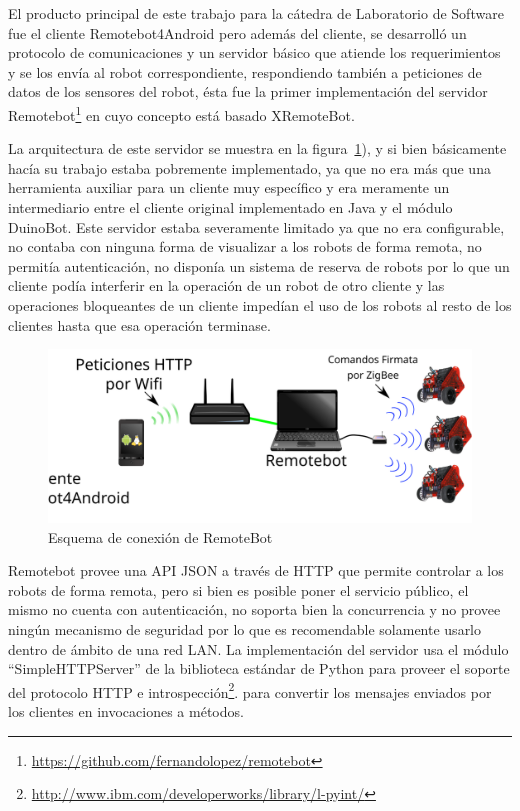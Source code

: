 El producto principal de este trabajo para la cátedra de Laboratorio de
Software fue el cliente
Remotebot4Android pero además del cliente, se desarrolló un
protocolo de comunicaciones
y un servidor básico que atiende los requerimientos y se los envía al
robot correspondiente, respondiendo también a peticiones de datos de
los sensores del
robot, ésta fue la primer implementación del servidor
Remotebot\footnote{\url{https://github.com/fernandolopez/remotebot}}
en cuyo concepto está basado XRemoteBot.

La arquitectura de este servidor se muestra en la
figura~\ref{fig:arquitectura_remotebot}), y si bien básicamente hacía
su trabajo
estaba pobremente implementado, ya que no era más que una herramienta auxiliar
para un cliente muy específico y era meramente un intermediario entre el
cliente original implementado en Java y el módulo DuinoBot. Este servidor
estaba severamente limitado
ya que no era configurable, no contaba con ninguna forma de visualizar a los
robots de forma remota, no permitía autenticación, no disponía un sistema
de reserva de robots por lo que un cliente podía interferir en la operación
de un robot de otro cliente y las operaciones bloqueantes de un cliente
impedían el uso de los robots al resto de los clientes hasta que esa operación
terminase.


\begin{figure}
    \centering
    \includegraphics[width=\textwidth]{figures/arquitectura_remotebot}
    \caption{Esquema de conexión de RemoteBot}\label{fig:arquitectura_remotebot}
\end{figure}



Remotebot provee una API JSON a través de HTTP que permite controlar a los
robots de forma remota, pero si bien es posible poner el servicio público,
el mismo no cuenta con autenticación, no soporta bien la concurrencia
y no provee ningún mecanismo de seguridad por lo que es recomendable solamente
usarlo dentro de ámbito de una red LAN.
La implementación del servidor
usa el módulo ``SimpleHTTPServer'' de la biblioteca estándar de Python para
proveer el soporte del protocolo HTTP e
introspección\footnote{\url{http://www.ibm.com/developerworks/library/l-pyint/}}.
para convertir los
mensajes enviados por los clientes en invocaciones a métodos.

